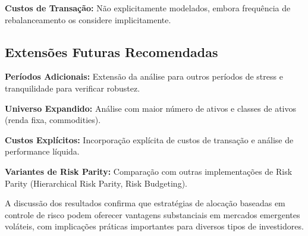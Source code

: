 \textbf{Custos de Transação:} Não explicitamente modelados, embora frequência de rebalanceamento os considere implicitamente.

\subsection{Extensões Futuras Recomendadas}

\textbf{Períodos Adicionais:} Extensão da análise para outros períodos de stress e tranquilidade para verificar robustez.

\textbf{Universo Expandido:} Análise com maior número de ativos e classes de ativos (renda fixa, commodities).

\textbf{Custos Explícitos:} Incorporação explícita de custos de transação e análise de performance líquida.

\textbf{Variantes de Risk Parity:} Comparação com outras implementações de Risk Parity (Hierarchical Risk Parity, Risk Budgeting).

A discussão dos resultados confirma que estratégias de alocação baseadas em controle de risco podem oferecer vantagens substanciais em mercados emergentes voláteis, com implicações práticas importantes para diversos tipos de investidores.